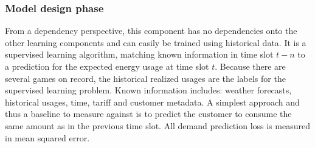 
%
%

\subsubsection{Model design phase}%
\label{sub:model_design}



From a dependency perspective, this component has no dependencies onto the other learning components and can easily be
trained using historical data. It is a supervised learning algorithm, matching known information in time slot
$t-n$ to a prediction for the expected energy usage at time slot $t$. Because there are several games on record, the
historical realized usages are the labels for the supervised learning problem. Known information includes: weather
forecasts, historical usages, time, tariff and customer metadata. A simplest approach and thus a baseline to
measure against is to predict the customer to consume the same amount as in the previous time slot. All demand
prediction loss is measured in mean squared error.

